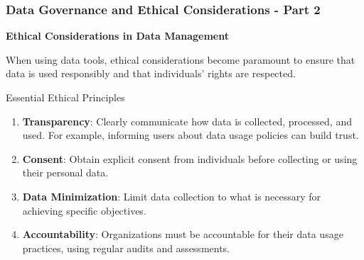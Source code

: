 \documentclass[aspectratio=169]{beamer}
\begin{document}
\begin{frame}[fragile]
    \frametitle{Data Governance and Ethical Considerations - Part 2}
    \textbf{Ethical Considerations in Data Management}
    
    When using data tools, ethical considerations become paramount to ensure that data is used responsibly and that individuals' rights are respected.
    
    \begin{block}{Essential Ethical Principles}
        \begin{enumerate}
            \item \textbf{Transparency}: Clearly communicate how data is collected, processed, and used. For example, informing users about data usage policies can build trust.
            \item \textbf{Consent}: Obtain explicit consent from individuals before collecting or using their personal data.
            \item \textbf{Data Minimization}: Limit data collection to what is necessary for achieving specific objectives.
            \item \textbf{Accountability}: Organizations must be accountable for their data usage practices, using regular audits and assessments.
        \end{enumerate}
    \end{block}
\end{frame}
\end{document}

